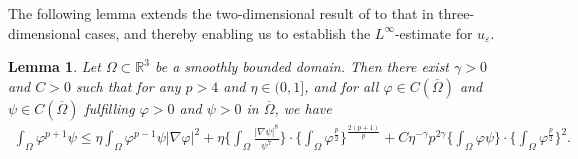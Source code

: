 \documentclass[12pt]{article}
\theoremstyle{plain}
\newtheorem{lemma}{Lemma}[section]
\theoremstyle{definition}
\numberwithin{equation}{section}
\begin{document}
The following lemma extends the two-dimensional result of \cite{WinklerEven} to that  in  three-dimensional cases, and thereby enabling us to establish the $L^{\infty}$-estimate for $u_\varepsilon$.
\begin{lemma}\label{lemma3.8}
Let $\Omega\subset\mathbb{R}^3$ be a smoothly bounded domain. Then there exist $\gamma>0$ and $C>0$ such that for any $p>4$ and $\eta\in(0,1]$, and for all $\varphi\in C(\overline{\Omega})$ and $\psi\in C(\overline{\Omega})$ fulfilling $\varphi>0$ and $\psi>0$ in $\overline{\Omega}$, we have
\begin{equation*}
\begin{split}
\int_\Omega \varphi^{p+1}\psi\leq\eta\int_\Omega\varphi^{p-1}\psi|\nabla\varphi|^2+\eta\bigg\{\int_\Omega\frac{|\nabla\psi|^8}{\psi^7}\bigg\}\cdot\bigg\{\int_\Omega\varphi^{\frac{p}{2}}\bigg\}^{\frac{2(p+1)} {p}}
+C\eta^{-\gamma}p^{2\gamma}\bigg\{\int_\Omega\varphi\psi\bigg\}\cdot\bigg\{\int_\Omega\varphi^{\frac{p}{2}}\bigg\}^{2}.
\end{split}
\end{equation*}
\end{lemma}
\end{document}
